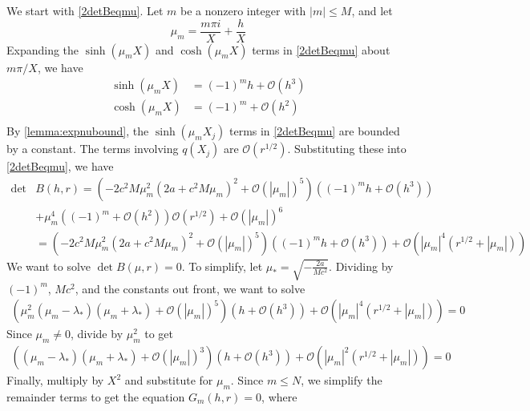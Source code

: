 \documentclass[thesis.tex]{subfiles}
\begin{document}
We start with \cref{2detBeqmu}. Let $m$ be a nonzero integer with $|m| \leq M$, and let
\[
\mu_m = \frac{m \pi i}{X} + \frac{h}{X}
\]
Expanding the $\sinh(\mu_m X)$ and $\cosh(\mu_m X)$ terms in \cref{2detBeqmu} about $m \pi/X$, we have
\begin{align*}
\sinh(\mu_m X) &= (-1)^m h + \mathcal{O}(h^3) \\
\cosh(\mu_m X) &= (-1)^m + \mathcal{O}(h^2) \\
\end{align*}
By \cref{lemma:expnubound}, the $\sinh(\mu_m X_j)$ terms in \cref{2detBeqmu} are bounded by a constant. The terms involving $q(X_j)$ are $\mathcal{O}(r^{1/2})$. Substituting these into \cref{2detBeqmu}, we have 
\begin{equation}\label{Bess1}
\begin{aligned}
\det &B(h, r) = \left(-2 c^2 M  \mu_m^2 \left( 2a + c^2 M \mu_m \right)^2 + \mathcal{O}( |\mu_m|)^5 \right) \left( (-1)^m h + \mathcal{O}(h^3) \right) \\
&+ \mu_m^4 \left( (-1)^m + \mathcal{O}(h^2)\right)\mathcal{O}(r^{1/2}) + \mathcal{O}\left( |\mu_m| \right)^6 \\
&= \left(-2 c^2 M  \mu_m^2 \left( 2a + c^2 M \mu_m \right)^2 + \mathcal{O}( |\mu_m|)^5 \right) \left( (-1)^m h + \mathcal{O}(h^3) \right) + \mathcal{O}\left( |\mu_m|^4(r^{1/2} + |\mu_m|) \right)
\end{aligned}
\end{equation}
We want to solve $\det B(\mu, r) = 0$. To simplify, let $\mu_* = \sqrt{-\frac{2a}{M c^2}}$. Dividing by $(-1)^m$, $M c^2$, and the constants out front, we want to solve 
\begin{equation}\label{Bess2}
\begin{aligned}
\left(\mu_m^2 (\mu_m - \lambda_*)(\mu_m + \lambda_*) + \mathcal{O}( |\mu_m|)^5 \right) \left( h + \mathcal{O}(h^3) \right) + \mathcal{O}\left( |\mu_m|^4(r^{1/2} + |\mu_m|) \right) = 0
\end{aligned}
\end{equation}
Since $\mu_m \neq 0$, divide by $\mu_m^2$ to get
\begin{equation}\label{Bess3}
\begin{aligned}
\left((\mu_m - \lambda_*)(\mu_m + \lambda_*) + \mathcal{O}( |\mu_m|)^3 \right) \left( h + \mathcal{O}(h^3) \right) + \mathcal{O}\left( |\mu_m|^2(r^{1/2} + |\mu_m|) \right) = 0
\end{aligned}
\end{equation}
Finally, multiply by $X^2$ and substitute for $\mu_m$. Since $m \leq N$, we simplify the remainder terms to get the equation $G_m(h, r) = 0$, where
\end{document}
